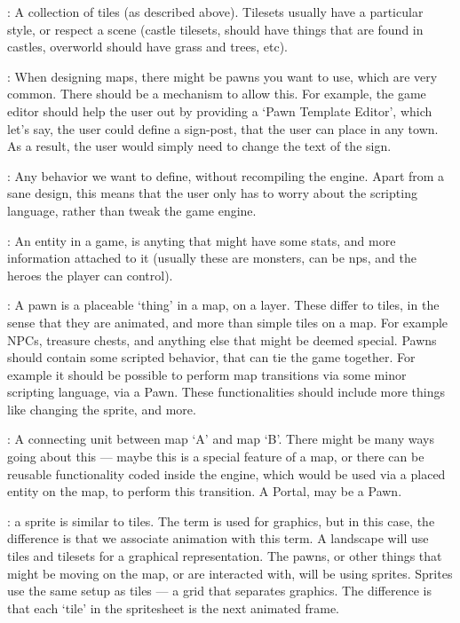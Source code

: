 \begin{description}
  : A collection of tiles (as described above). Tilesets usually
    have a particular style, or respect a scene (castle tilesets, should have
    things that are found in castles, overworld should have grass and trees, etc).


  : When designing maps, there might be pawns you want to
    use, which are very common. There should be a mechanism to allow this. For
    example, the game editor should help the user out by providing a `Pawn
    Template Editor', which let's say, the user could define a sign-post, that
    the user can place in any town. As a result, the user would simply need to
    change the text of the sign.

  : Any behavior we want to define, without recompiling the
    engine. Apart from a sane design, this means that the user only has to worry
    about the scripting language, rather than tweak the game engine.

  : An entity in a game, is anyting that might have some stats, and
    more information attached to it (usually these are monsters, can be nps, and
    the heroes the player can control).

  : A pawn is a placeable `thing' in a
    map, on a layer. These differ to tiles, in the sense that they are animated,
    and more than simple tiles on a map. For example NPCs, treasure chests, and
    anything else that might be deemed special. Pawns should contain some
    scripted behavior, that can tie the game together. For example it should be
    possible to perform map transitions via some minor scripting language, via a
    Pawn. These functionalities should include more things like changing the
    sprite, and more.

  : A connecting unit between map `A' and map `B'. There might be
    many ways going about this --- maybe this is a special feature of a map, or
    there can be reusable functionality coded inside the engine, which would be
    used via a placed entity on the map, to perform this transition. A Portal, may
    be a Pawn.

  : a sprite is similar to tiles. The term is
    used for graphics, but in this case, the difference is that we associate
    animation with this term. A landscape will use tiles and tilesets for a
    graphical representation. The pawns, or other things that might be moving on
    the map, or are interacted with, will be using sprites. Sprites use the same
    setup as tiles --- a grid that separates graphics. The difference is that
    each `tile' in the spritesheet is the next animated frame.

\end{description}

